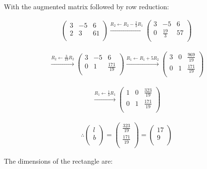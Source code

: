 \documentclass[journal]{IEEEtran}
\begin{document}
With the augmented matrix followed by row reduction:

\begin{align}
\left(
\begin{array}{cc|c}
3 & -5 & 6 \\
2 & 3 & 61 \\
\end{array}
\right)
\overset{R_2 \leftarrow R_2 - \frac{2}{3}R_1}{\longrightarrow}
\left(
\begin{array}{cc|c}
3 & -5 & 6 \\
0 & \frac{19}{3} & 57 \\
\end{array}
\right)
\end{align}

\begin{align}
\overset{R_2 \leftarrow \frac{3}{19}R_2}{\longrightarrow}
\left(
\begin{array}{cc|c}
3 & -5 & 6 \\
0 & 1 & \frac{171}{19} \\
\end{array}
\right)
\overset{R_1 \leftarrow R_1 + 5R_2}{\longrightarrow}
\left(
\begin{array}{cc|c}
3 & 0 & \frac{969}{19} \\
0 & 1 & \frac{171}{19} \\
\end{array}
\right)
\end{align}

\begin{align}
\overset{R_1 \leftarrow \frac{1}{3}R_1}{\longrightarrow}
\left(
\begin{array}{cc|c}
1 & 0 & \frac{323}{19} \\
0 & 1 & \frac{171}{19} \\
\end{array}
\right)
\end{align}

\begin{align}
\therefore
\begin{pmatrix}
l \\
b \\
\end{pmatrix}
=
\begin{pmatrix}
\frac{323}{19} \\
\frac{171}{19} \\
\end{pmatrix}
=
\begin{pmatrix}
17 \\
9 \\
\end{pmatrix}
\end{align}

The dimensions of the rectangle are:
\begin{center}
\end{center}
\end{document}
